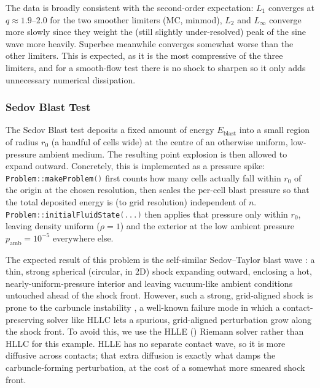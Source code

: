 \documentclass[11pt]{report}
\newcommand{\cpp}[1]{\lstinline[language=C++]{#1}}
\begin{document}
The data is broadly consistent with the second-order expectation: $L_1$ converges at $q\approx1.9$--$2.0$ for the two smoother limiters (MC, minmod), $L_2$ and $L_\infty$ converge more slowly since they weight the (still slightly under-resolved) peak of the sine wave more heavily.
Superbee meanwhile converges somewhat worse than the other limiters. This is expected, as it is the most compressive of the three limiters, and for a smooth-flow test there is no shock to sharpen so it only adds unnecessary numerical dissipation.

\subsubsection{Sedov Blast Test}
\label{sec:sedov-blast}

The Sedov Blast test deposits a fixed amount of energy $E_\mathrm{blast}$ into a small region of radius $r_0$ (a handful of cells wide) at the centre of an otherwise uniform, low-pressure ambient medium. 
The resulting point explosion is then allowed to expand outward. 
Concretely, this is implemented as a pressure spike: \cpp{Problem::makeProblem()} first counts how many cells actually fall within $r_0$ of the origin at the chosen resolution, then scales the per-cell blast pressure so that the total deposited energy is (to grid resolution) independent of $n$. \cpp{Problem::initialFluidState(...)} then applies that pressure only within $r_0$, leaving density uniform ($\rho=1$) and the exterior at the low ambient pressure $p_\mathrm{amb}=10^{-5}$ everywhere else. 

The expected result of this problem is the self-similar Sedov--Taylor blast wave \citep{Taylor1950,Sedov1959}: a thin, strong spherical (circular, in 2D) shock expanding outward, enclosing a hot, nearly-uniform-pressure interior and leaving vacuum-like ambient conditions untouched ahead of the shock front. However, such a strong, grid-aligned shock is prone to the carbuncle instability \citep{Quirk1994}, a well-known failure mode in which a contact-preserving solver like HLLC lets a spurious, grid-aligned perturbation grow along the shock front.
To avoid this, we use the HLLE ()  Riemann solver rather than HLLC for this example. HLLE has no separate contact wave, so it is more diffusive across contacts; that extra diffusion is exactly what damps the carbuncle-forming perturbation, at the cost of a somewhat more smeared shock front.
\end{document}
